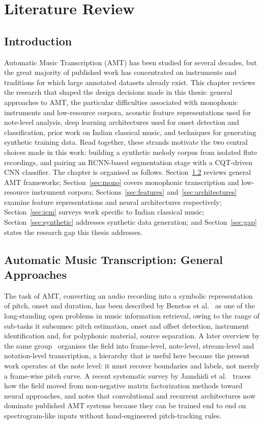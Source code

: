 \chapter{Literature Review}
\label{ch:literature}

\section{Introduction}

Automatic Music Transcription (AMT) has been studied for several decades, but the great majority of published work has concentrated on instruments and traditions for which large annotated datasets already exist. This chapter reviews the research that shaped the design decisions made in this thesis: general approaches to AMT, the particular difficulties associated with monophonic instruments and low-resource corpora, acoustic feature representations used for note-level analysis, deep learning architectures used for onset detection and classification, prior work on Indian classical music, and techniques for generating synthetic training data. Read together, these strands motivate the two central choices made in this work: building a synthetic melody corpus from isolated flute recordings, and pairing an RCNN-based segmentation stage with a CQT-driven CNN classifier. The chapter is organised as follows. Section~\ref{sec:amt-general} reviews general AMT frameworks; Section~\ref{sec:mono} covers monophonic transcription and low-resource instrument corpora; Sections~\ref{sec:features} and~\ref{sec:architectures} examine feature representations and neural architectures respectively; Section~\ref{sec:icm} surveys work specific to Indian classical music; Section~\ref{sec:synthetic} addresses synthetic data generation; and Section~\ref{sec:gap} states the research gap this thesis addresses.

\section{Automatic Music Transcription: General Approaches}
\label{sec:amt-general}

The task of AMT, converting an audio recording into a symbolic representation of pitch, onset and duration, has been described by Benetos et al.~\cite{ref1} as one of the long-standing open problems in music information retrieval, owing to the range of sub-tasks it subsumes: pitch estimation, onset and offset detection, instrument identification and, for polyphonic material, source separation. A later overview by the same group~\cite{ref2} organises the field into frame-level, note-level, stream-level and notation-level transcription, a hierarchy that is useful here because the present work operates at the note level: it must recover boundaries and labels, not merely a frame-wise pitch curve. A recent systematic survey by Jamshidi et al.~\cite{ref3} traces how the field moved from non-negative matrix factorization methods toward neural approaches, and notes that convolutional and recurrent architectures now dominate published AMT systems because they can be trained end to end on spectrogram-like inputs without hand-engineered pitch-tracking rules.

